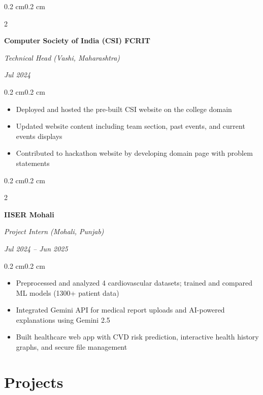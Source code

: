 \documentclass[10pt, letterpaper]{article}
\newenvironment{highlights}{
    \begin{itemize}[
        topsep=0.10 cm,
        parsep=0.10 cm,
        partopsep=0pt,
        itemsep=0pt,
        leftmargin=0.4 cm + 10pt
    ]
}{\end{itemize}}
\newenvironment{onecolentry}{
    \begin{adjustwidth}{0.2 cm}{0.2 cm}
}{\end{adjustwidth}}
\newenvironment{twocolentry}[2][]{
    \onecolentry
    \def\secondColumn{#2}
    \setcolumnwidth{\fill, 4.5 cm}
    \begin{paracol}{2}
}{
    \switchcolumn \raggedleft \secondColumn
    \end{paracol}
    \endonecolentry
}
\begin{document}
    \vspace{0.2 cm}

    \begin{twocolentry}{
        \textit{Jul 2024}
    }
        \textbf{Computer Society of India (CSI) FCRIT}
        
        \textit{Technical Head (Vashi, Maharashtra)}
    \end{twocolentry}
    
    \vspace{0.10 cm}
    \begin{onecolentry}
        \begin{highlights}
            \item Deployed and hosted the pre-built CSI website on the college domain
            \item Updated website content including team section, past events, and current events displays
            \item Contributed to hackathon website by developing domain page with problem statements
        \end{highlights}
    \end{onecolentry}

    \vspace{0.2 cm}

    \begin{twocolentry}{
        \textit{Jul 2024 -- Jun 2025}
    }
        \textbf{IISER Mohali}
        
        \textit{Project Intern (Mohali, Punjab)}
    \end{twocolentry}
    
    \vspace{0.10 cm}
    \begin{onecolentry}
        \begin{highlights}
            \item Preprocessed and analyzed 4 cardiovascular datasets; trained and compared ML models (1300+ patient data)
            \item Integrated Gemini API for medical report uploads and AI-powered explanations using Gemini 2.5
            \item Built healthcare web app with CVD risk prediction, interactive health history graphs, and secure file management
        \end{highlights}
    \end{onecolentry}

    \section{Projects}
    
\end{document}
